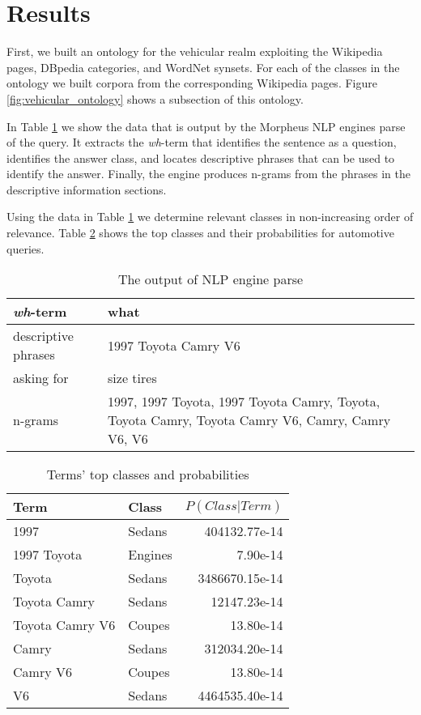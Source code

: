 \section{Results}
\label{sec:results}


First, we built an ontology for the vehicular realm exploiting the Wikipedia pages, DBpedia categories, and WordNet synsets. For each of the classes in the ontology we built corpora from the corresponding Wikipedia pages. Figure \ref{fig:vehicular_ontology} shows a subsection of this ontology.

In Table \ref{tbl:nlp_engine_parse} we show the data that is output by the Morpheus NLP engines parse of the query.  It extracts the \emph{wh}-term that identifies the sentence as a question, identifies the answer class, and locates descriptive phrases that can be used to identify the answer. Finally, the engine produces n-grams from the phrases in the descriptive information sections.

Using the data in Table \ref{tbl:nlp_engine_parse} we determine relevant classes in non-increasing order of relevance. Table \ref{tbl:term_classes} shows the top classes and their probabilities for automotive queries.

\begin{table}[!]\footnotesize
	\begin{tabular}{|l|p{4.9cm}|}
		\hline 
		\emph{wh}-term & what \\
		\hline 
		descriptive phrases & \small 1997 Toyota Camry V6 \\
		\hline 
		asking for & size tires \\
		\hline 
		n-grams & \small 1997, 1997 Toyota, 1997 Toyota Camry, Toyota, Toyota Camry, Toyota Camry V6, Camry, Camry V6, V6 \\
		\hline
	\end{tabular}
	\caption{The output of NLP engine parse}
	\label{tbl:nlp_engine_parse} 
\end{table}

\begin{table}[!]\footnotesize

\begin{tabular}{| p{3.5cm} | p{1.45cm} | r |}
\hline 
Term & Class & $P(Class|Term)$ \\ \hline
1997 & Sedans & 404132.77e-14\\ 
1997 Toyota & Engines & 7.90e-14\\ 
Toyota  & Sedans & 3486670.15e-14\\ 
Toyota Camry & Sedans & 12147.23e-14\\ 
Toyota Camry V6 & Coupes & 13.80e-14\\ 
Camry & Sedans & 312034.20e-14\\ 
Camry V6 & Coupes & 13.80e-14\\ 
V6 & Sedans & 4464535.40e-14\\ \hline
\end{tabular}        

\caption{Terms' top classes and probabilities}
\label{tbl:term_classes}   

\end{table}

